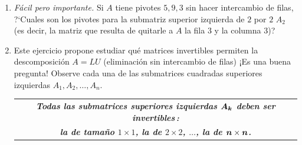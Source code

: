\documentclass[12pt,a4paper]{article}
\newcommand{\bi}[1]{\hbox{\boldmath$#1$}}
\newcommand\1{\mbox{\,\vrule height-0.8pt depth1.0pt width2pc\,}}
\newcommand\2{\mbox{\,\vrule height-0.8pt depth1.0pt width1pc\,}}
\newcommand{\embf}[1]{\emph{\bfseries{#1}}}
\begin{document}
\begin{enumerate}
\vspace{-11pt}
\begin{displaymath}
  A=\begin{bmatrix}
    1 & 1 & 0\\ 1 & 2 & 1\\ 0 & 1 & 2\end{bmatrix}
  \quad\hbox{y}\quad A=
  \begin{bmatrix} a & a & 0\\ a & a+b & b\\
    0 & b & b+c\end{bmatrix}.
\end{displaymath}


\item \emph{F\'acil pero importante.}
Si $A$ tiene pivotes $5,9,3$ sin hacer intercambio de filas,
?`Cuales son los pivotes para la submatriz superior izquierda de
$2$ por $2$ $A_2$ (es decir, la matriz que resulta de quitarle a $A$ la fila $3$ y la columna $3$)?

\item Este ejercicio propone estudiar qu\'e matrices invertibles permiten la descomposici\'on $A=LU$
(eliminaci\'on sin intercambio de filas) ¡Es una buena pregunta!
Observe cada una de las submatrices cuadradas superiores izquierdas $A_1, A_2,\ldots,A_n$. %


\vspace{-9pt}
\begin{center}
\begin{tabular}{c}\embf{
Todas las submatrices superiores izquierdas $\bi{A_k}$
deben ser invertibles\,:} \\
\embf{
la de tamaño $1 \times 1$, la de $2 \times 2$, $\ldots$, la de $\bi{n} \times \bi{n}$.
}
\end{tabular}
\end{center}


\end{enumerate}
\end{document}
